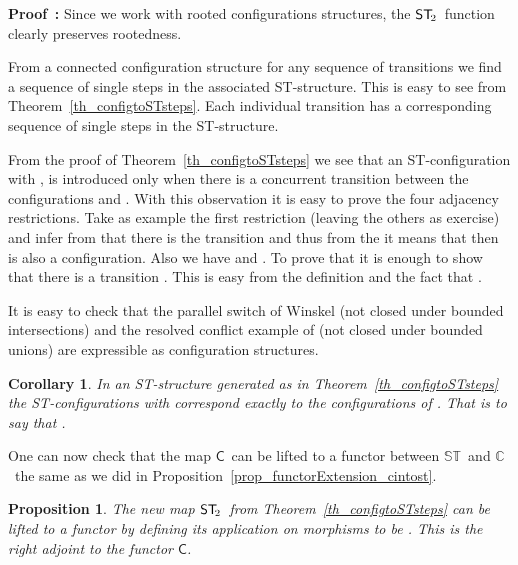 \documentclass[submission,copyright,creativecommons]{eptcs}
\newtheorem{proposition}[theorem]{Proposition}
\newtheorem{corollary}[theorem]{Corollary}
\newenvironment{proof}[1][\!\!\,]{\vspace{1ex}\noindent\textbf{Proof #1: }}{\hfill\vspace{2ex}}
\newcommand{\cp}[1]{}
\newcommand\allC{\ensuremath{\mathbb{C}}}
\newcommand\allST{\ensuremath{\mathbb{ST}}}
\newcommand\cintostSecond{\ensuremath{\mathsf{ST}_{\hspace{-0.4ex}2}}}
\newcommand\stintoc{\ensuremath{\mathsf{C}}}
\begin{document}
\begin{proof}
Since we work with rooted configurations structures, the \cintostSecond\ function clearly preserves rootedness.

From a connected configuration structure for any sequence of transitions  we find a sequence of single steps in the associated ST-structure. This is easy to see from Theorem~\ref{th_configtoSTsteps}. Each individual transition has a corresponding sequence of single steps in the ST-structure.

From the proof of Theorem~\ref{th_configtoSTsteps} we see that an ST-configuration  with , is introduced only when there is a concurrent transition between the configurations  and . With this observation it is easy to prove the four adjacency restrictions. Take as example the first restriction (leaving the others as exercise) and infer from  that there is the transition  and thus from the \cite[Def.2.1]{GlabbeekP09configStruct} it means that  then  is also a configuration. Also we have  and . To prove that  it is enough to show that there is a transition . This is easy from the definition \cite[Def.2.1]{GlabbeekP09configStruct} and the fact that .

It is easy to check that the parallel switch of Winskel \cite{Winskel86} (not closed under bounded intersections) and the resolved conflict example of \cite[Ex.2]{GlabbeekP09configStruct} (not closed under bounded unions) are expressible as configuration structures.
\end{proof}



\begin{corollary}\label{cor_counit_C_ST}
In an ST-structure  generated as in Theorem~\ref{th_configtoSTsteps} the ST-con\-figurations with  correspond exactly to the configurations of . That is to say that .
\end{corollary}

\cp{The above equivalence should also be proven as an adjunction between the two categories.}

One can now check that the map \stintoc\ can be lifted to a functor between \allST\ and \allC\ the same as we did in Proposition~\ref{prop_functorExtension_cintost}.

\begin{proposition}
The new map \cintostSecond\ from Theorem~\ref{th_configtoSTsteps} can be lifted to a functor by defining its application on morphisms to be . This is the right adjoint to the functor \stintoc.
\end{proposition}
\end{document}
